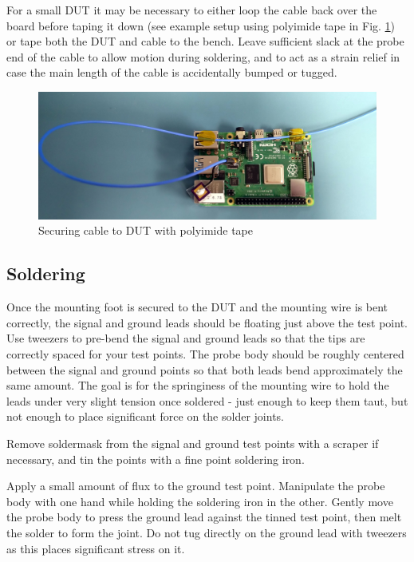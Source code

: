 \documentclass[11pt]{article}
\begin{document}
For a small DUT it may be necessary to either loop the cable back over the board before taping it down (see example
setup using polyimide tape in Fig. \ref{cable-secured}) or tape both the DUT and cable to the bench. Leave sufficient
slack at the probe end of the cable to allow motion during soldering, and to act as a strain relief in case the main
length of the cable is accidentally bumped or tugged.

\begin{figure}[h]
\centering
\includegraphics[width=12cm]{cable-tape.jpg}
\caption{Securing cable to DUT with polyimide tape}
\label{cable-secured}
\end{figure}

\FloatBarrier

\subsection{Soldering}

Once the mounting foot is secured to the DUT and the mounting wire is bent correctly, the signal and ground leads
should be floating just above the test point. Use tweezers to pre-bend the signal and ground leads so that the tips are
correctly spaced for your test points. The probe body should be roughly centered between the signal and ground points
so that both leads bend approximately the same amount. The goal is for the springiness of the mounting wire to hold the
leads under very slight tension once soldered - just enough to keep them taut, but not enough to place significant
force on the solder joints.

Remove soldermask from the signal and ground test points with a scraper if necessary, and tin the points with a fine
point soldering iron.

Apply a small amount of flux to the ground test point. Manipulate the probe body with one hand while holding the
soldering iron in the other. Gently move the probe body to press the ground lead against the tinned test point, then
melt the solder to form the joint. Do not tug directly on the ground lead with tweezers as this places significant
stress on it.
\end{document}
